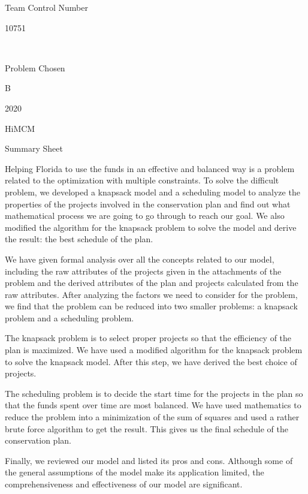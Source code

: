 \documentclass{article}
\begin{document}
\begin{center}
Team Control Number

\Huge 10751

\normalsize ~

Problem Chosen

\Huge B

\Large 2020

HiMCM

Summary Sheet
\end{center}

\normalsize

Helping Florida to use the funds in an effective and balanced way is a problem related to the optimization with multiple constraints.
To solve the difficult problem, we developed a knapsack model and a scheduling model to analyze the properties of the projects involved in the conservation plan and find out what mathematical process we are going to go through to reach our goal.
We also modified the algorithm for the knapsack problem to solve the model and derive the result: the best schedule of the plan.

We have given formal analysis over all the concepts related to our model,
including the raw attributes of the projects given in the attachments of the problem
and the derived attributes of the plan and projects calculated from the raw attributes.
After analyzing the factors we need to consider for the problem, we find that the problem can be reduced into two smaller problems: a knapsack problem and a scheduling problem.

The knapsack problem is to select proper projects so that the efficiency of the plan is maximized.
We have used a modified algorithm for the knapsack problem to solve the knapsack model.
After this step, we have derived the best choice of projects.

The scheduling problem is to decide the start time for the projects in the plan so that the funds spent over time are most balanced.
We have used mathematics to reduce the problem into a minimization of the sum of squares and used a rather brute force algorithm to get the result.
This gives us the final schedule of the conservation plan.

Finally, we reviewed our model and listed its pros and cons.
Although some of the general assumptions of the model make its application limited,
the comprehensiveness and effectiveness of our model are significant.

\newpage

\tableofcontents
\end{document}
